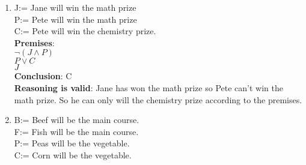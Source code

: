 \begin{questions}

\begin{solution}
    \begin{enumerate}
        \item 
                J:= Jane will win the math prize \\
                P:= Pete will win the math prize \\
                C:= Pete will win the chemistry prize. \\
                
                \textbf{Premises}: \\
                $\neg (J \wedge P)$ \\
                $P \vee C$ \\
                $J$ \\
                
                \textbf{Conclusion}: C \\
                
                \textbf{Reasoning is valid}: Jane has won the math prize so Pete can't win the math prize. So he can only will the chemistry prize according to the premises.
        
        \item 
                B:= Beef will be the main course. \\
                F:= Fish will be the main course. \\
                P:= Peas will be the vegetable. \\
                C:= Corn will be the vegetable. \\
                

\end{enumerate}
\end{solution}
\end{questions}
